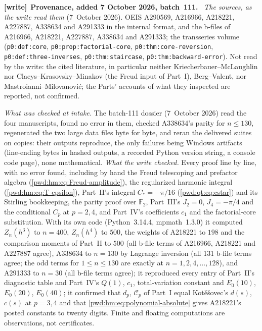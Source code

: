 \documentclass[11pt,letterpaper]{article}
\numberwithin{equation}{section}
\theoremstyle{remark}\newtheorem{remark}[theorem]{Remark}
\newcommand{\file}[1]{\nolinkurl{#1}}
\newenvironment{writenote}[1][]{\par\smallskip\begingroup\small
 \noindent\textbf{[write]}\if\relax\detokenize{#1}\relax\else~\textbf{#1.}\fi\ }%
 {\par\endgroup\smallskip}
\begin{document}
\begin{writenote}[Provenance, added 7 October 2026, batch~111]
\emph{The sources, as the write read them} (7~October 2026). OEIS A290569,
A216966, A218221, A227887, A338634 and A291333 in the internal format, and the
b-files of A216966, A218221, A227887, A338634 and A291333; the transseries
volume
(\file{p0:def:core}, \file{p0:prop:factorial-core},
\file{p0:thm:core-reversion}, \file{p0:def:three-inverses},
\file{p0:thm:staircase}, \file{p0:thm:backward-error}). Not read by the write:
the cited literature, in particular neither Kriecherbauer--McLaughlin nor
Claeys--Krasovsky--Minakov (the Freud input of Part~I), Berg--Valent, nor
Mastroianni--Milovanovi\'c; the Parts' accounts of what they inspected are
reported, not confirmed.

\emph{What was checked at intake.} The batch-111 dossier (7~October 2026)
read the four manuscripts, found no error in them, checked A338634's parity
for $n\le130$, regenerated the two large data files byte for byte, and reran
the delivered suites on copies: their outputs reproduce, the only failures
being Windows artifacts (line-ending bytes in hashed outputs, a recorded
Python version string, a console code page), none mathematical. \emph{What
the write checked.} Every proof line by line, with no error found, including
by hand the Freud telescoping and prefactor algebra
(\eqref{pwd:hm:eq:Freud-amplitude}), the regularized harmonic integral
(\eqref{pwd:hm:eq:T-epsilon}), Part~II's integral $C_*=-\pi/16$
(\eqref{pwd:qt:eq:cstar}) and its Stirling bookkeeping, the parity proof
over $\mathbb F_2$, Part~III's $J_2=0$, $J_4=-\pi/4$ and the conditional $C_p$
at $p=2,4$, and Part~IV's coefficients $c_1$ and the factorial-core
substitution. With its own code (Python~3.14.4, mpmath~1.3.0) it computed
$Z_n(h^3)$ to $n=400$, $Z_n(h^4)$ to $500$, the weights of A218221 to $198$
and the comparison moments of Part~II to $500$ (all b-file terms of A216966,
A218221 and A227887 agree), A338634 to $n=130$ by Lagrange inversion (all 131
b-file terms agree; the odd terms for $1\le n\le130$ are exactly at
$n=1,2,4,\dots,128$), and A291333 to $n=30$ (all b-file terms agree); it
reproduced every entry of Part~II's diagnostic table and Part~IV's
$Q(1)$, $c_1$, total-variation constant and $E_0(10)$, $E_0(20)$,
$E_0(40)$; it confirmed that $d_p$, $\mathcal C_p$ of Part~I equal
Kot\v e\v sovec's $d(s)$, $c(s)$ at $p=3,4$ and that
\eqref{pwd:hm:eq:polynomial-absolute} gives A218221's posted constants to
twenty digits. Finite and floating computations are observations, not
certificates.


\end{writenote}
\end{document}

